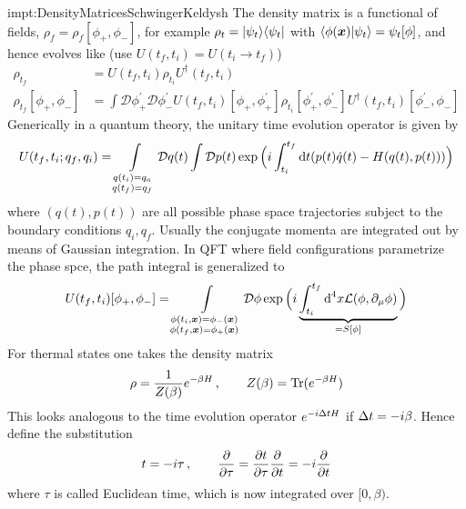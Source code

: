 \begin{impt}{impt:DensityMatricesSchwingerKeldysh}
    The density matrix is a functional of fields, $\rho_f=\rho_f[\phi_+,\phi_-]$, for example $\rho_t={\lvert\psi_t\rangle}{\langle\psi_t\rvert}$ with ${\langle\phi({\boldsymbol{x}})\vert\psi_t\rangle}=\psi_t[\phi]$, and hence evolves like (use $U(t_f,t_i)=U(t_i\rightarrow t_f)$)
    \begin{subequations}
        \begin{align}
            \rho_{t_f}                & =U(t_f,t_i)\rho_{t_i}U^\dagger(t_f,t_i)                                                                                                                              \\
            \rho_{t_f}[\phi_+,\phi_-] & =\int\mathcal{D}\phi^\prime_+\mathcal{D}\phi^\prime_-U(t_f,t_i)[\phi_+,\phi^\prime_+]\rho_{t_i}[\phi^\prime_+,\phi^\prime_-]U^\dagger(t_f,t_i)[\phi^\prime_-,\phi_-]
        \end{align}
    \end{subequations}
    Generically in a quantum theory, the unitary time evolution operator is given by
    \begin{equation}
        U(t_f,t_i;q_f,q_i)=\int\limits_{\substack{q(t_i)=q_a\\q(t_f)=q_f}}\mathcal{D}q(t)\int\mathcal{D}p(t)\exp\Big({i}\int_{t_i}^{t_f}\text{d} t(p(t)\dot{q}(t)-H(q(t),p(t)))\Big)
    \end{equation}
    where $(q(t),p(t))$ are all possible phase space trajectories subject to the boundary conditions $q_i,q_f$. Usually the conjugate momenta are integrated out by means of Gaussian integration. In QFT where field configurations parametrize the phase spce, the path integral is generalized to
    \begin{equation}
        U(t_f,t_i)[\phi_+,\phi_-]=\int\limits_{\substack{\phi(t_i,{\boldsymbol{x}})=\phi_-({\boldsymbol{x}})\\\phi(t_f,{\boldsymbol{x}})=\phi_+({\boldsymbol{x}})}}\mathcal{D}\phi\exp\Big({i}\underbrace{\int_{t_i}^{t_f}\text{d}^4x\mathcal{L}(\phi,\partial_\mu\phi)}_{=S[\phi]}\Big)
    \end{equation}
    For thermal states one takes the density matrix
    \begin{equation}
        \rho=\frac{1}{Z(\beta)}e^{-\beta H}\,,\qquad Z(\beta)={\text{Tr}}(e^{-\beta H})
    \end{equation}
    This looks analogous to the time evolution operator $e^{-{i}\Delta t H}$ if $\Delta t=-{i}\beta$. Hence define the substitution
    \begin{equation}
        t=-{i}\tau\,,\qquad\frac{\partial}{\partial\tau}=\frac{\partial t}{\partial\tau}\frac{\partial}{\partial t}=-{i}\frac{\partial}{\partial t}
    \end{equation}
    where $\tau$ is called Euclidean time, which is now integrated over $[0,\beta)$.
\end{impt}

